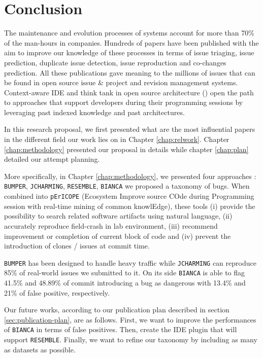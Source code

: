 
\chapter{Conclusion\label{chap:conclusion}}

The maintenance and evolution processes of systems account for more than 70\% of the man-hours in companies.
Hundreds of papers have been published with the aim to improve our knowledge of these processes in terms of issue triaging, issue prediction, duplicate issue detection, issue reproduction and co-changes prediction.
All these publications gave meaning to the millions of issues that can be found in open source issue \& project and revision management systems.
Context-aware IDE and think tank in open source architecture (\cite{chansler2011architecture}) open the path to approaches that support developers during their programming sessions by leveraging past indexed knowledge and past architectures.

In this research proposal, we first presented what are the most influential papers in the different field our work lies on in Chapter \ref{chap:relwork}.
Chapter \ref{chap:methodology} presented our proposal in details while chapter \ref{chap:plan} detailed our attempt planning.

More specifically, in Chapter \ref{chap:methodology}, we presented four approaches : {\tt BUMPER}, {\tt JCHARMING}, {\tt RESEMBLE}, {\tt BIANCA} we proposed a taxonomy of bugs. When combined into {\tt pErICOPE} (Ecosystem Improve source COde during Programming session with real-time mining of common knowlEdge), these tools (i) provide the possibility to search related software artifacts using natural language, (ii) accurately reproduce field-crash in lab environment, (iii) recommend improvement or completion of current block of code and (iv) prevent the introduction of clones / issues at commit time.


{\tt BUMPER} has been designed to handle heavy traffic while {\tt JCHARMING} can reproduce 85\% of real-world issues we submitted to it. On its side {\tt BIANCA} is able to flag 41.5\% and 48.89\% of commit introducing a bug as dangerous with 13.4\% and 21\% of false positive, respectively.

Our future works, according to our publication plan described in section \ref{sec:publication-plan}, are as follows. First, we want to improve the performances of {\tt BIANCA} in terms of false positives.
Then, create the IDE plugin that will support {\tt RESEMBLE}. Finally, we want to refine our taxonomy by including as many as datasets as possible.
